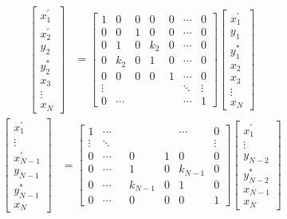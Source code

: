 \documentclass[a4paper,twoside,10pt,english]{report}
\begin{document}
\begin{align*}
\left[\begin{array}{c}
x_{1}^{\prime}\\
x_{2}^{\prime}\\
y_{2}\\
y_{2}^{*}\\
x_{3}\\
\vdots\\
x_{N}
\end{array}\right] & = \left[\begin{array}{ccccccc}
1 & 0 & 0 & 0 & 0 &\cdots & 0\\
0 & 0 & 1 & 0 & 0 &\cdots & 0\\
0 & 1 & 0 & k_{2} & 0 &\cdots & 0\\
0 & k_{2} & 0 & 1 & 0 &\cdots & 0\\
0 & 0 & 0 & 0 & 1 & \cdots & 0\\
\vdots &  & & &  & \ddots & \vdots\\
0 & \cdots &  & & & \cdots & 1
\end{array}\right]\left[\begin{array}{c}
x_{1}^{\prime} \\
y_{1}\\
y_{1}^{*}\\
x_{2}\\
x_{3}\\
\vdots\\
x_{N}
\end{array}\right]
\end{align*}
\begin{align*}
\left[\begin{array}{c}
x_{1}^{\prime}\\
\vdots\\
x_{N-1}^{\prime}\\
y_{N-1}\\
y_{N-1}^{*}\\
x_{N}
\end{array}\right] & = \left[\begin{array}{ccccccc}
1 & \cdots & & & & \cdots & 0\\
\vdots & \ddots & & & & & \vdots\\
0 & \cdots & & 0 & 1 & 0 & 0\\
0 & \cdots & & 1 & 0 & k_{N-1} & 0\\
0 & \cdots & & k_{N-1} & 0 & 1 & 0\\
0 & \cdots & & 0 & 0 & 0 & 1
\end{array}\right]\left[\begin{array}{c}
x_{1}^{\prime}\\
\vdots\\
y_{N-2}\\
y_{N-2}^{*}\\
x_{N-1}\\
x_{N}
\end{array}\right]
\end{align*}
\end{document}
